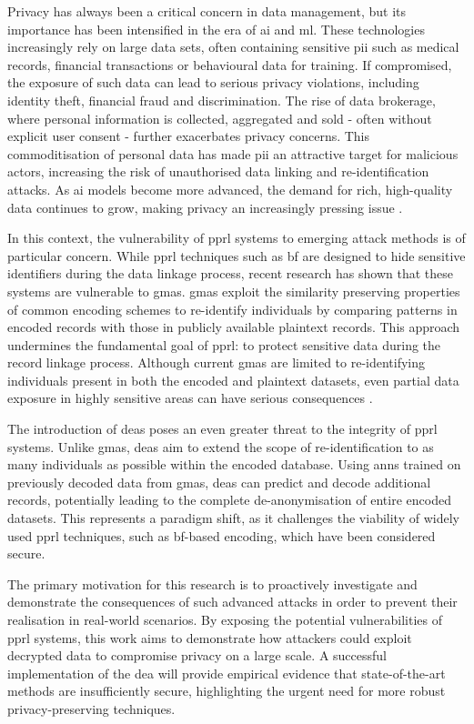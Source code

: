 Privacy has always been a critical concern in data management, but its importance has been intensified in the era of \ac{ai} and \ac{ml}.
These technologies increasingly rely on large data sets, often containing sensitive \ac{pii} such as medical records, financial transactions or behavioural data for training. If compromised, the exposure of such data can lead to serious privacy violations, including identity theft, financial fraud and discrimination.
The rise of data brokerage, where personal information is collected, aggregated and sold - often without explicit user consent - further exacerbates privacy concerns.
This commoditisation of personal data has made \ac{pii} an attractive target for malicious actors, increasing the risk of unauthorised data linking and re-identification attacks.
As \ac{ai} models become more advanced, the demand for rich, high-quality data continues to grow, making privacy an increasingly pressing issue \cite{king2024rethinking, manheim2019artificial}.

In this context, the vulnerability of \ac{pprl} systems to emerging attack methods is of particular concern.
While \ac{pprl} techniques such as \ac{bf} are designed to hide sensitive identifiers during the data linkage process, recent research has shown that these systems are vulnerable to \ac{gma}s.
\ac{gma}s exploit the similarity preserving properties of common encoding schemes to re-identify individuals by comparing patterns in encoded records with those in publicly available plaintext records.
This approach undermines the fundamental goal of \ac{pprl}: to protect sensitive data during the record linkage process.
Although current \ac{gma}s are limited to re-identifying individuals present in both the encoded and plaintext datasets, even partial data exposure in highly sensitive areas can have serious consequences \cite{schaefer2024,vidanage2020graph}.

The introduction of \ac{dea}s poses an even greater threat to the integrity of \ac{pprl} systems.
Unlike \ac{gma}s, \ac{dea}s aim to extend the scope of re-identification to as many individuals as possible within the encoded database.
Using \ac{ann}s trained on previously decoded data from \ac{gma}s, \ac{dea}s can predict and decode additional records, potentially leading to the complete de-anonymisation of entire encoded datasets.
This represents a paradigm shift, as it challenges the viability of widely used \ac{pprl} techniques, such as \ac{bf}-based encoding, which have been considered secure.

The primary motivation for this research is to proactively investigate and demonstrate the consequences of such advanced attacks in order to prevent their realisation in real-world scenarios.
By exposing the potential vulnerabilities of \ac{pprl} systems, this work aims to demonstrate how attackers could exploit decrypted data to compromise privacy on a large scale.
A successful implementation of the \ac{dea} will provide empirical evidence that state-of-the-art methods are insufficiently secure, highlighting the urgent need for more robust privacy-preserving techniques.

